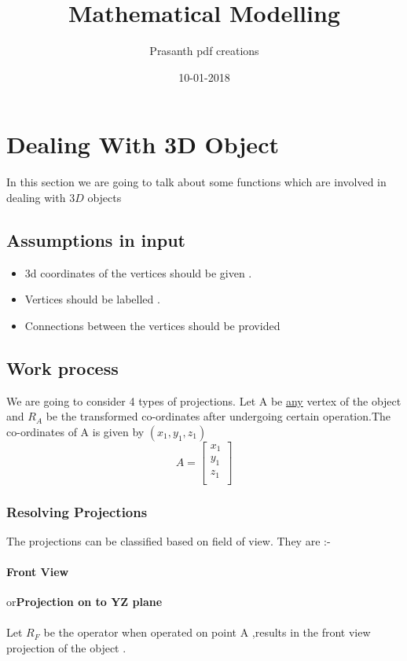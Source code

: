 \documentclass{article}
\begin{document}
\title{Mathematical Modelling}
\author{Prasanth pdf creations}
\date{10-01-2018}
\maketitle
\section{Dealing With 3D Object}
\hspace{15mm} In this section we are going to talk about some functions which are involved in dealing with $3D$ objects
\subsection{Assumptions in input}
\begin{itemize}
\item 3d coordinates of the vertices should be given .
\item Vertices should be labelled .
\item Connections between the vertices should be provided
\end{itemize}

\subsection{Work process}

\hspace{15mm}We are going to consider 4 types of projections.
Let A be \underline{any} vertex of the object and $R_{A}$ be the transformed co-ordinates after undergoing certain operation.The co-ordinates of A is given by $(x_{1},y_{1},z_{1})$
\begin{equation}
A=\left[\begin{matrix}
x_{1}\\
y_{1}\\
z_{1}\\
\end{matrix}\right]
\end{equation}


\subsubsection{Resolving Projections}
\hspace{15mm} The projections can be classified based on field of view. They are :-
\paragraph{Front View}or\hspace{5mm}\textbf{Projection on to YZ plane}\\\\
Let $R_{F}$ be the operator when operated on point A ,results in the front view projection of the object .
\end{document}
